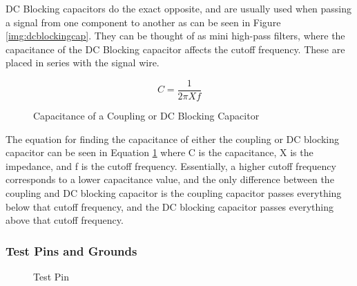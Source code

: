 DC Blocking capacitors do the exact opposite, and are usually used when passing a signal from one component to another as can be 
seen in Figure \ref{img:dcblockingcap}. They can be thought of as mini high-pass filters, where the capacitance of the DC Blocking
capacitor affects the cutoff frequency. These are placed in series with the signal wire.
\begin{figure}[H]
\begin{equation}
  C = \frac{1}{2\pi Xf}
  \end{equation}
  \caption{Capacitance of a Coupling or DC Blocking Capacitor}
  \label{eq:capacitance}
\end{figure}
The equation for finding the capacitance of either the coupling or DC blocking capacitor can be seen in Equation \ref{eq:capacitance} 
where C is the capacitance, X is the impedance, and f is the cutoff frequency.
Essentially, a higher cutoff frequency corresponds to a lower capacitance value, and the only difference between the coupling and
DC blocking capacitor is the coupling capacitor passes everything below that cutoff frequency, and the DC blocking capacitor passes
everything above that cutoff frequency.
\subsubsection{Test Pins and Grounds}
\begin{figure}[H]
  \centering
\caption{Test Pin}
\label{img:testpin}
\end{figure}

